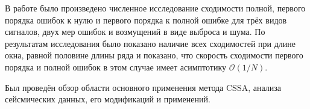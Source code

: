 \documentclass[specialist,
               substylefile = spbu.rtx,
               subf,href,colorlinks=true, 12pt]{disser}
\begin{document}
В работе было произведено численное исследование сходимости полной, первого порядка ошибок к нулю и первого порядка к полной ошибке для трёх видов сигналов, двух мер ошибок и возмущений в виде выброса и шума. По результатам исследования было показано наличие всех сходимостей при длине окна, равной половине длины ряда и показано, что скорость сходимости первого порядка и полной ошибок в этом случае имеет асимптотику $\mathcal{O}(1/N)$. 

Был проведён обзор области основного применения метода CSSA, анализа сейсмических данных, его модификаций и применений.



\end{document}
